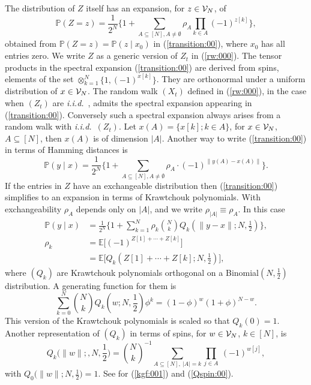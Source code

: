 \documentclass[preprint,11pt]{elsarticle}
\theoremstyle{remark}
\def\iid{\emph{i.i.d.}~}
\begin{document}
 The distribution of $Z$ itself has an expansion, for $z \in {\cal V}_N$, of
  \begin{equation*}
\mathbb{P}(Z=z) = \frac{1}{2^N}\Big \{1 + \sum_{A\subseteq [N], A \ne \emptyset}
 \rho_A\prod_{k\in A}(-1)^{z[k]}\Big \},
 \label{zexpansion:00}
 \end{equation*} 
 obtained from $\mathbb{P}(Z=z)=\mathbb{P}(z\mid x_0)$ in (\ref{transition:00}), where $x_0$ has all entries zero.
 We write $Z$ as a generic version of $Z_t$ in (\ref{rw:000}).
 The tensor products in the spectral expansion (\ref{transition:00}) are derived from spins, elements of the set $\otimes_{k=1}^N\big \{1, (-1)^{x[k]}\big \}$. They are orthonormal under a uniform distribution of $x \in {\cal V}_N$.
The random walk  $(X_t)$ defined in (\ref{rw:000}), in the case when $(Z_t)$ are 
\iid,  admits the spectral expansion  appearing in (\ref{transition:00}). Conversely such a spectral expansion always arises from a random walk with \iid $(Z_t)$.
 Let $x(A) = \big \{x[k]; k \in A\big \}$, for $x\in {\cal V}_N$, $A\subseteq [N]$, then
$x(A)$ is of dimension $|A|$.  %
Another way to write (\ref{transition:00}) in terms of Hamming distances is
 \begin{equation*}
\mathbb{P}(y\mid x) = \frac{1}{2^N}\Big \{1 + \sum_{A\subseteq [N], A \ne \emptyset}
 \rho_A \cdot(-1)^{\|y(A)-x(A)\|}\Big \}.
 \label{transition:0001}
 \end{equation*}
If the entries in $Z$ have an exchangeable distribution  then (\ref{transition:00}) simplifies to an expansion in terms of Krawtchouk polynomials. With exchangeability
$\rho_A$ depends only on $|A|$, and we write $\rho_{|A|} \equiv \rho_A$. In this case
\begin{align}
\mathbb{P}(y\mid x) &= \frac{1}{2^N}\Big \{1 + \sum_{k=1}^N\rho_k{N\choose k}
Q_k(\|y-x\|;N,\frac{1}{2})\Big \},
 \label{transition:01}\\
  \rho_k &= \mathbb{E}\big [(-1)^{Z[1]+\cdots + Z[k]}\big ]\label{transitionspin:02}\\  
  &= \mathbb{E}\big [Q_k(Z[1]+\cdots + Z[k];N,\frac{1}{2}) \big ],
 \nonumber
\end{align}
where $(Q_k)$ are Krawtchouk polynomials orthogonal on a Binomial$(N,\frac{1}{2})$ distribution. A generating function for them is
\begin{equation}
\sum_{k=0}^N{N\choose k}Q_k(w;N,\frac{1}{2})\phi^k = (1-\phi)^w(1+\phi)^{N-w}.
\label{kgf:001}
\end{equation}
This version of the Krawtchouk polynomials is scaled so that $Q_k(0)=1$.
Another representation of $(Q_k)$ in terms of spins, for $w\in {\cal V}_N$, $k \in [N]$, is
\begin{equation}
Q_k\big (\|w\|;,N,\frac{1}{2}\big ) = {N\choose k}^{-1}\sum_{A\subseteq [N],\ |A|=k}\prod_{j\in A}\ (-1)^{w[j]},
\label{Qspin:00}
\end{equation}
with $Q_0\big (\|w\|;N,\frac{1}{2}\big ) = 1$. See \cite{DG2012} for (\ref{kgf:001}) and (\ref{Qspin:00}).
\end{document}
